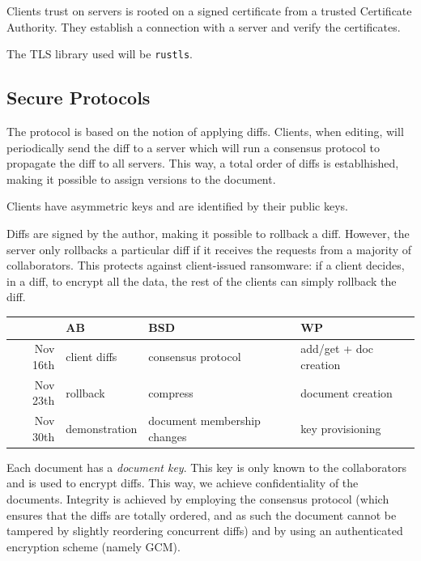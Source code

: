 Clients trust on servers is rooted on a signed certificate from a
trusted Certificate Authority. They establish a connection with a
server and verify the certificates.

The TLS library used will be \texttt{rustls}\cite{rustls}.

\subsection{Secure Protocols}

The protocol is based on the notion of applying diffs.
Clients, when editing, will periodically send the diff to a
server which will run a consensus protocol to propagate the diff
to all servers. This way, a total order of diffs is establhished,
making it possible to assign versions to the document.

Clients have asymmetric keys and are identified by their public
keys.

Diffs are signed by the author, making it possible to rollback a
diff. However, the server only rollbacks a particular diff if it
receives the requests from a majority of collaborators. This
protects against client-issued ransomware: if a client decides,
in a diff, to encrypt all the data, the rest of the clients can
simply rollback the diff.

\begin{table}[ht]
    \centering
    \label{Effort Commitment}
    \begin{tabular}{r|l|l|l}
        & AB & BSD & WP \\
        \hline
        Nov 16th & client diffs & consensus protocol & add/get + doc creation \\
        Nov 23th & rollback & compress & document creation \\
        Nov 30th & demonstration & document membership changes & key provisioning\\
    \end{tabular}
\end{table}

Each document has a \emph{document key}. This key is only known
to the collaborators and is used to encrypt diffs. This way, we
achieve confidentiality of the documents. Integrity is achieved
by employing the consensus protocol (which ensures that the diffs
are totally ordered, and as such the document cannot be tampered
by slightly reordering concurrent diffs) and by using an
authenticated encryption scheme (namely GCM).

